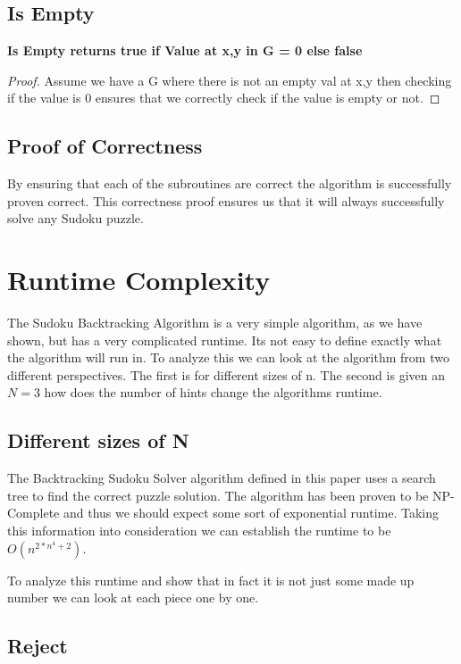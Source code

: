\documentclass{sig-alternate}
\begin{document}
\subsection{Is Empty}
\textbf{Is Empty returns true if Value at x,y in G = 0 else false}
\begin{proof}
Assume we have a G where there is not an empty val at x,y then checking if the value is 0 ensures that we correctly check if the value is empty or not. 
\end{proof}

\subsection{Proof of Correctness}
By ensuring that each of the subroutines are correct the algorithm is successfully proven correct. This correctness proof ensures us that it will always successfully solve any Sudoku puzzle. 

\section{Runtime Complexity}


The Sudoku Backtracking Algorithm is a very simple algorithm, as we have shown, but has a very complicated runtime. Its not easy to define exactly what the algorithm will run in. To analyze this we can look at the algorithm from two different perspectives. The first is for different sizes of n. The second is given an $N=3$ how does the number of hints change the algorithms runtime. 

\subsection{Different sizes of N}
The Backtracking Sudoku Solver algorithm defined in this paper uses a search tree to find the correct puzzle solution. The algorithm has been proven to be NP-Complete and thus we should expect some sort of exponential runtime. \cite{YATO} Taking this information into consideration we can establish the runtime to be $O(n^{2*n^4 + 2})$. 

To analyze this runtime and show that in fact it is not just some made up number we can look at each piece one by one. 

\subsection{Reject}
\end{document}
